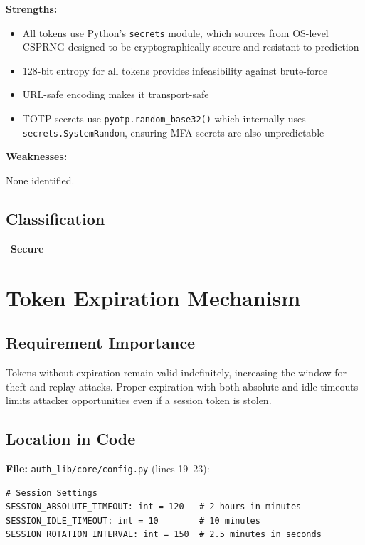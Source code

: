 \documentclass[11pt,a4paper]{article}
\newcommand{\secure}{\textcolor{securegreen}{\checkmark~\textbf{Secure}}}
\begin{document}
\textbf{Strengths:}
\begin{itemize}[noitemsep]
    \item All tokens use Python's \texttt{secrets} module, which sources from OS-level CSPRNG designed to be cryptographically secure and resistant to prediction
    \item 128-bit entropy for all tokens provides infeasibility against brute-force
    \item URL-safe encoding makes it transport-safe
    \item TOTP secrets use \texttt{pyotp.random\_base32()} which internally uses \texttt{secrets.SystemRandom}, ensuring MFA secrets are also unpredictable
\end{itemize}

\textbf{Weaknesses:}

None identified.

\subsection{Classification}
\secure

\newpage
\section{Token Expiration Mechanism}

\subsection{Requirement Importance}
Tokens without expiration remain valid indefinitely, increasing the window for theft and replay attacks. Proper expiration with both absolute and idle timeouts limits attacker opportunities even if a session token is stolen.

\subsection{Location in Code}

\textbf{File:} \texttt{auth\_lib/core/config.py} (lines 19--23):
\begin{lstlisting}
# Session Settings
SESSION_ABSOLUTE_TIMEOUT: int = 120   # 2 hours in minutes
SESSION_IDLE_TIMEOUT: int = 10        # 10 minutes
SESSION_ROTATION_INTERVAL: int = 150  # 2.5 minutes in seconds
\end{lstlisting}
\end{document}
